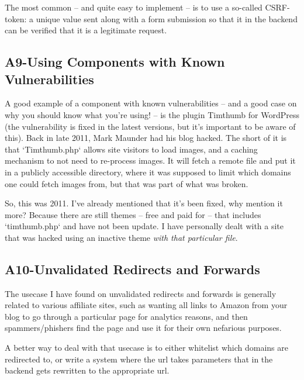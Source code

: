 The most common -- and quite easy to implement -- is to use a so-called CSRF-token: a unique value sent along with a form submission so that it in the backend can be verified that it is a legitimate request.

\subsection{A9-Using Components with Known Vulnerabilities}
\noindent
A good example of a component with known vulnerabilities -- and a good case on why you should know what you're using! -- is the plugin Timthumb for WordPress (the vulnerability is fixed in the latest versions, but it's important to be aware of this). Back in late 2011, Mark Maunder \citep{MarkMaunder2011} had his blog hacked. The short of it is that `Timthumb.php` allows site visitors to load images, and a caching mechanism to not need to re-process images. It will fetch a remote file and put it in a publicly accessible directory, where it was supposed to limit which domains one could fetch images from, but that was part of what was broken.

So, this was 2011. I've already mentioned that it's been fixed, why mention it more? Because there are still themes -- free and paid for -- that includes `timthumb.php` and have not been update. I have personally dealt with a site that was hacked using an inactive theme \emph{with that particular file}.

\subsection{A10-Unvalidated Redirects and Forwards}
\noindent
The usecase I have found on unvalidated redirects and forwards is generally related to various affiliate sites, such as wanting all links to Amazon from your blog to go through a particular page for analytics reasons, and then spammers/phishers find the page and use it for their own nefarious purposes.

A better way to deal with that usecase is to either whitelist which domains are redirected to, or write a system where the url takes parameters that in the backend gets rewritten to the appropriate url.


